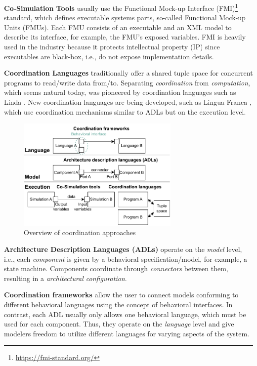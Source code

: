 \documentclass[runningheads]{llncs}
\begin{document}
\textbf{Co-Simulation Tools} usually use the Functional Mock-up Interface (FMI)\footnote{\url{https://fmi-standard.org/}} standard, which defines executable systems parts, so-called Functional Mock-up Units (FMUs).
Each FMU consists of an executable and an XML model to describe its interface, for example, the FMU's exposed variables.
FMI is heavily used in the industry because it protects intellectual property (IP) since executables are black-box, i.e., do not expose implementation details.

\textbf{Coordination Languages} traditionally offer a shared tuple space for concurrent programs to read/write data from/to.
Separating \textit{coordination} from \textit{computation}, which seems natural today, was pioneered by coordination languages such as Linda \cite{carrieroLindaContext1989}.
New coordination languages are being developed, such as Lingua Franca \cite{lohstrohReactorsDeterministicModel2020}, which use coordination mechanisms similar to ADLs but on the execution level.

\begin{figure}[ht]
	\centering
	\includegraphics[width=0.7\textwidth]{images/overview}
	\caption{Overview of coordination approaches}
	\label{fig:overview}
\end{figure}

\textbf{Architecture Description Languages (ADLs)} operate on the \textit{model} level, i.e., each \textit{component} is given by a behavioral specification/model, for example, a state machine.
Components coordinate through \textit{connectors} between them, resulting in a \textit{architectural configuration}.

\textbf{Coordination frameworks} allow the user to connect models conforming to different behavioral languages using the concept of behavioral interfaces.
In contrast, each ADL usually only allows one behavioral language, which must be used for each component.
Thus, they operate on the \textit{language} level and give modelers freedom to utilize different languages for varying aspects of the system.
\end{document}
